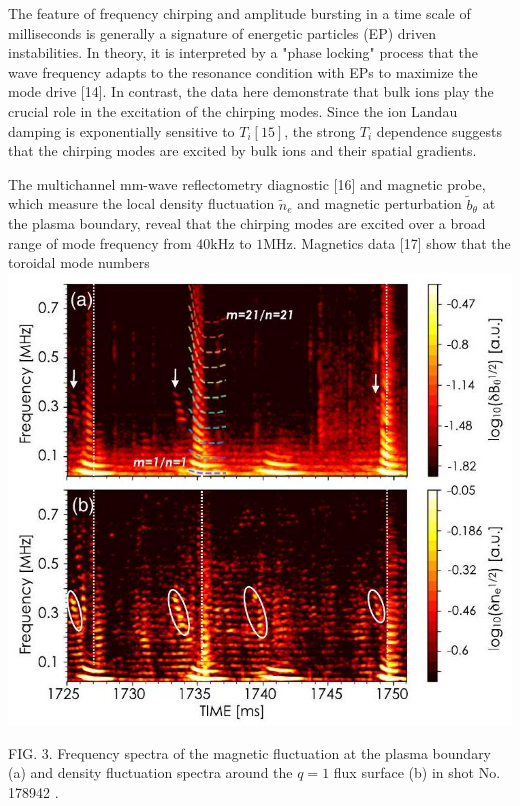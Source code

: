 \documentclass[10pt]{article}
\begin{document}
The feature of frequency chirping and amplitude bursting in a time scale of milliseconds is generally a signature of energetic particles (EP) driven instabilities. In theory, it is interpreted by a "phase locking" process that the wave frequency adapts to the resonance condition with EPs to maximize the mode drive [14]. In contrast, the data here demonstrate that bulk ions play the crucial role in the excitation of the chirping modes. Since the ion Landau damping is exponentially sensitive to $T_{i}[15]$, the strong $T_{i}$ dependence suggests that the chirping modes are excited by bulk ions and their spatial gradients.

The multichannel mm-wave reflectometry diagnostic [16] and magnetic probe, which measure the local density fluctuation $\tilde{n}_{e}$ and magnetic perturbation $\tilde{b}_{\theta}$ at the plasma boundary, reveal that the chirping modes are excited over a broad range of mode frequency from $40 \mathrm{kHz}$ to $1 \mathrm{MHz}$. Magnetics data [17] show that the toroidal mode numbers
\includegraphics[max width=\textwidth, center]{2023_06_19_f8dbb752866ca158c73eg-3(1)}

FIG. 3. Frequency spectra of the magnetic fluctuation at the plasma boundary (a) and density fluctuation spectra around the $q=1$ flux surface (b) in shot No. 178942 .
\end{document}
